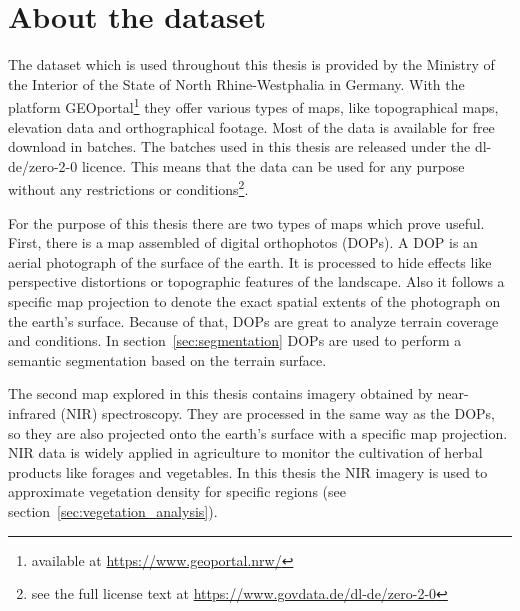 \section{About the dataset}
The dataset which is used throughout this thesis is provided by the Ministry of the Interior of the State of North Rhine-Westphalia in Germany. With the platform GEOportal\footnote{available at \url{https://www.geoportal.nrw/}} they offer various types of maps, like topographical maps, elevation data and orthographical footage. Most of the data is available for free download in batches. The batches used in this thesis are released under the dl-de/zero-2-0 licence. This means that the data can be used for any purpose without any restrictions or conditions\footnote{see the full license text at \url{https://www.govdata.de/dl-de/zero-2-0}}.

For the purpose of this thesis there are two types of maps which prove useful. First, there is a map assembled of digital orthophotos (DOPs). A DOP is an aerial photograph of the surface of the earth. It is processed to hide effects like perspective distortions or topographic features of the landscape. Also it follows a specific map projection to denote the exact spatial extents of the photograph on the earth's surface. Because of that, DOPs are great to analyze terrain coverage and conditions. In section~\ref{sec:segmentation} DOPs are used to perform a semantic segmentation based on the terrain surface.

The second map explored in this thesis contains imagery obtained by near-infrared (NIR) spectroscopy. They are processed in the same way as the DOPs, so they are also projected onto the earth's surface with a specific map projection. NIR data is widely applied in agriculture to monitor the cultivation of herbal products like forages and vegetables. In this thesis the NIR imagery is used to approximate vegetation density for specific regions (see section~\ref{sec:vegetation_analysis}).

